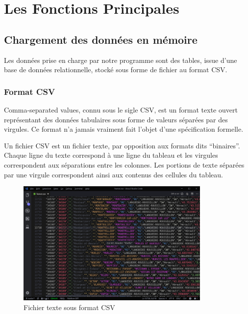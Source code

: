 \documentclass[oneside,13pt,a4paper]{report}
\begin{document}
\section{Les Fonctions Principales}

\subsection{Chargement des données en mémoire}

Les données prise en charge par notre programme sont des tables, issue d'une base de données relationnelle, stocké sous forme de fichier au format CSV.

\subsubsection{Format CSV}
\label{csv}
Comma-separated values, connu sous le sigle CSV, est un format texte ouvert %
représentant des données tabulaires sous forme de valeurs séparées par des virgules.
Ce format n'a jamais vraiment fait l'objet d'une spécification formelle.

Un fichier CSV est un fichier texte, par opposition aux formats dits \enquote{binaires}.
Chaque ligne du texte correspond à une ligne du tableau et les virgules correspondent aux séparations entre les colonnes.
Les portions de texte séparées par une virgule correspondent ainsi aux contenus des cellules du tableau.

\begin{figure}[!h]
	\centering
	\includegraphics[width=0.85\textwidth]{img/csv.png}
	\caption{Fichier texte sous format CSV}
\end{figure}
\end{document}
